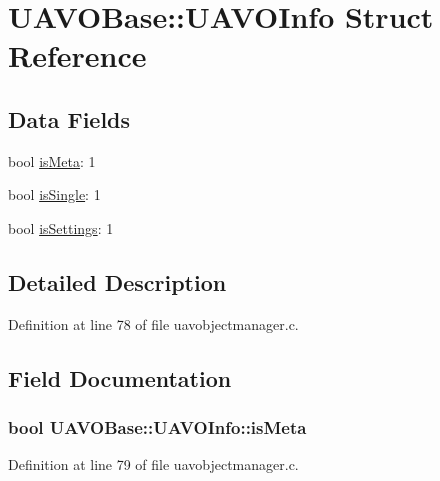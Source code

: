 \hypertarget{struct_u_a_v_o_base_1_1_u_a_v_o_info}{\section{\-U\-A\-V\-O\-Base\-:\-:\-U\-A\-V\-O\-Info \-Struct \-Reference}
\label{struct_u_a_v_o_base_1_1_u_a_v_o_info}
}
\subsection*{\-Data \-Fields}
\begin{DoxyCompactItemize}
\item 
bool \hyperlink{struct_u_a_v_o_base_1_1_u_a_v_o_info_a5358cdae3a703bf0ad8b1bb4fc19d1ca}{is\-Meta}\-: 1
\item 
bool \hyperlink{struct_u_a_v_o_base_1_1_u_a_v_o_info_a2ac5c0e20d294c304f14e18fd2fdc61a}{is\-Single}\-: 1
\item 
bool \hyperlink{struct_u_a_v_o_base_1_1_u_a_v_o_info_a24c38e3db94c7b88d4dd0cfdd2736b4d}{is\-Settings}\-: 1
\end{DoxyCompactItemize}


\subsection{\-Detailed \-Description}


\-Definition at line 78 of file uavobjectmanager.\-c.



\subsection{\-Field \-Documentation}
\hypertarget{struct_u_a_v_o_base_1_1_u_a_v_o_info_a5358cdae3a703bf0ad8b1bb4fc19d1ca}{
\subsubsection[{is\-Meta}]{\setlength{\rightskip}{0pt plus 5cm}bool {\bf \-U\-A\-V\-O\-Base\-::\-U\-A\-V\-O\-Info\-::is\-Meta}}}\label{struct_u_a_v_o_base_1_1_u_a_v_o_info_a5358cdae3a703bf0ad8b1bb4fc19d1ca}


\-Definition at line 79 of file uavobjectmanager.\-c.


